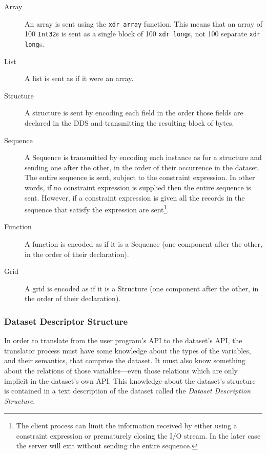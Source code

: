 \begin{description}

\item [Array] An array is sent using the {\tt xdr\_array}
  function. This means that an array of 100 {\tt Int32}s is sent as a
  single block of 100 {\tt xdr long}s, not 100 separate {\tt xdr
  long}s.

\item [List] A list is sent as if it were an array.

\item [Structure] A structure is sent by encoding each field in the order
  those fields are declared in the DDS and transmitting the resulting block
  of bytes.

\item [Sequence] A Sequence is transmitted by encoding each instance as for a
  structure and sending one after the other, in the order of their occurrence
  in the dataset. The entire sequence is sent, subject to the constraint
  expression. In other words, if no constraint expression is supplied then
  the entire sequence is sent. However, if a constraint expression is given
  all the records in the sequence that satisfy the expression are
  sent\footnote{The client process can limit the information received by
    either using a constraint expression or prematurely closing the I/O
    stream. In the later case the server will exit without sending the entire
    sequence.}.

\item [Function] A function is encoded as if it is a Sequence (one component
  after the other, in the order of their declaration).

\item [Grid] A grid is encoded as if it is a Structure (one component
  after the other, in the order of their declaration).

\end{description}

\subsubsection{Dataset Descriptor Structure}
\label{api:dds}

In order to translate from the user program's API to the dataset's API, the
translator process must have some knowledge about the types of the variables,
and their semantics, that comprise the dataset. It must also know something
about the relations of those variables---even those relations which are only
implicit in the dataset's own API\@. This knowledge about the dataset's
structure is contained in a text description of the dataset called the {\em
  Dataset Description Structure}.

